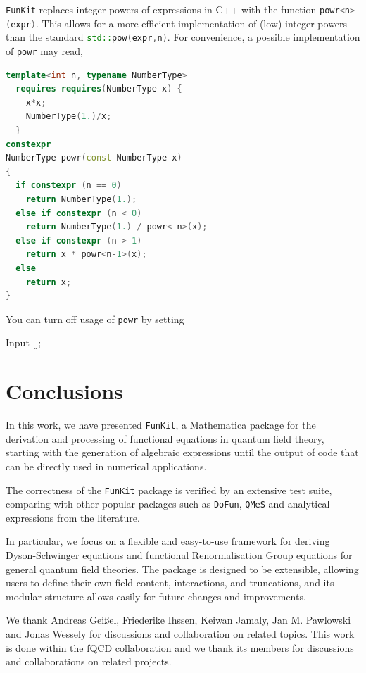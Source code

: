 \documentclass[10pt,prd,nofootinbib,superscriptaddress,twocolumn]{revtex4-2}
\newcommand{\cpp}{\lstinline[language=C++,style=myStyle]}
\newcommand{\FunKit}{\texttt{FunKit}\xspace}
\newcommand{\QMeS}{\texttt{QMeS}\xspace}
\newcommand{\DoFun}{\texttt{DoFun}\xspace}
\begin{document}
%
\FunKit replaces integer powers of expressions in C++ with the function \cpp{powr<n>(expr)}. This allows for a more efficient implementation of (low) integer powers than the standard \cpp{std::pow(expr,n)}. For convenience, a possible implementation of \cpp{powr} may read,
%
\begin{lstlisting}[language=c++,style=myStyle]
template<int n, typename NumberType>
  requires requires(NumberType x) {
    x*x;
    NumberType(1.)/x;
  }
constexpr
NumberType powr(const NumberType x)
{
  if constexpr (n == 0)
    return NumberType(1.);
  else if constexpr (n < 0)
    return NumberType(1.) / powr<-n>(x);
  else if constexpr (n > 1)
    return x * powr<n-1>(x);
  else
    return x;
}
\end{lstlisting}
%
You can turn off usage of \cpp{powr} by setting
%
\begin{mmaCell}{Input}
 [];
\end{mmaCell}


\section{Conclusions}

In this work, we have presented \FunKit, a Mathematica package for the derivation and processing of functional equations in quantum field theory, starting with the generation of algebraic expressions until the output of code that can be directly used in numerical applications.

The correctness of the \FunKit package is verified by an extensive test suite, comparing with other popular packages such as \DoFun, \QMeS and analytical expressions from the literature.

In particular, we focus on a flexible and easy-to-use framework for deriving Dyson-Schwinger equations and functional Renormalisation Group equations for general quantum field theories. The package is designed to be extensible, allowing users to define their own field content, interactions, and truncations, and its modular structure allows easily for future changes and improvements.

\begin{acknowledgments}
We thank Andreas Gei\ss{}el, Friederike Ihssen, Keiwan Jamaly, Jan M. Pawlowski and Jonas Wessely for discussions and collaboration on related topics. This work is done within the fQCD collaboration \cite{fQCD} and we thank its members for discussions and collaborations on related projects.
	
\end{acknowledgments}
\end{document}
